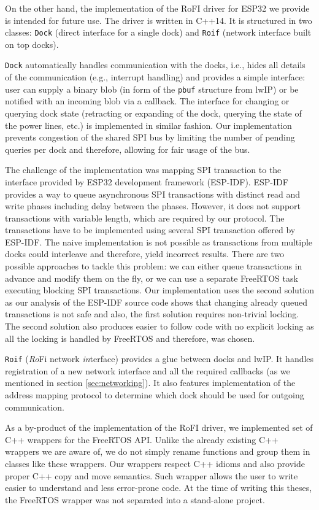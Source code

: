 On the other hand, the implementation of the RoFI driver for ESP32 we provide is
intended for future use. The driver is written in C++14. It is structured in two
classes: \texttt{Dock} (direct interface for a single dock) and \texttt{Roif}
(network interface built on top docks).

\texttt{Dock} automatically handles communication with the docks, i.e., hides
all details of the communication (e.g., interrupt handling) and provides a
simple interface: user can supply a binary blob (in form of the \texttt{pbuf}
structure from lwIP) or be notified with an incoming blob via a callback. The
interface for changing or querying dock state (retracting or expanding of the
dock, querying the state of the power lines, etc.) is implemented in similar
fashion. Our implementation prevents congestion of the shared SPI bus by
limiting the number of pending queries per dock and therefore, allowing for fair
usage of the bus.

The challenge of the implementation was mapping SPI transaction to the interface
provided by ESP32 development framework (ESP-IDF). ESP-IDF provides a way to
queue asynchronous SPI transactions with distinct read and write phases
including delay between the phases. However, it does not support transactions
with variable length, which are required by our protocol. The transactions have
to be implemented using several SPI transaction offered by ESP-IDF. The naive
implementation is not possible as transactions from multiple docks could
interleave and therefore, yield incorrect results. There are two possible
approaches to tackle this problem: we can either queue transactions in advance
and modify them on the fly, or we can use a separate FreeRTOS task executing
blocking SPI transactions. Our implementation uses the second solution as our
analysis of the ESP-IDF source code shows that changing already queued
transactions is not safe and also, the first solution requires non-trivial
locking. The second solution also produces easier to follow code with no
explicit locking as all the locking is handled by FreeRTOS and therefore, was
chosen.

\texttt{Roif} (\emph{Ro}Fi network \emph{in}terface) provides a glue between
docks and lwIP. It handles registration of a new network interface and all the
required callbacks (as we mentioned in section \ref{sec:networking}). It also
features implementation of the address mapping protocol to determine which dock
should be used for outgoing communication.

As a by-product of the implementation of the RoFI driver, we implemented set of
C++ wrappers for the FreeRTOS API. Unlike the already existing C++ wrappers we
are aware of, we do not simply rename functions and group them in classes like
these wrappers. Our wrappers respect C++ idioms and also provide proper C++ copy
and move semantics. Such wrapper allows the user to write easier to understand
and less error-prone code. At the time of writing this theses, the FreeRTOS
wrapper was not separated into a stand-alone project.

